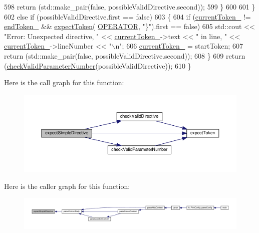 \begin{DoxyCode}
598                 \textcolor{keywordflow}{return} (std::make\_pair(\textcolor{keyword}{false}, possibleValidDirective.second));
599             \}
600         
601         \}
602         \textcolor{keywordflow}{else} \textcolor{keywordflow}{if} (possibleValidDirective.first == \textcolor{keyword}{false})
603         \{
604             \textcolor{keywordflow}{if} (\hyperlink{classft_1_1_parser_a942c5b794d108f144c5b5028aaa34cb6}{currentToken\_} != \hyperlink{classft_1_1_parser_a538ba3ab8ee1d0cef5cc3c999f3ab44c}{endToken\_} && \hyperlink{classft_1_1_parser_a1615a752d3642bb53598e2c8db810db0}{expectToken}(
      \hyperlink{namespaceft_aa520fbf142ba1e7e659590c07da31921a6411d9d6073252e4d316493506bbb979}{OPERATOR}, \textcolor{stringliteral}{"\}"}).first == \textcolor{keyword}{false})
605                 std::cout << \textcolor{stringliteral}{"Error: Unexpected directive, "} << \hyperlink{classft_1_1_parser_a942c5b794d108f144c5b5028aaa34cb6}{currentToken\_}->text << \textcolor{stringliteral}{" in
       line, "} << \hyperlink{classft_1_1_parser_a942c5b794d108f144c5b5028aaa34cb6}{currentToken\_}->lineNumber << \textcolor{stringliteral}{"\(\backslash\)n"};
606             \hyperlink{classft_1_1_parser_a942c5b794d108f144c5b5028aaa34cb6}{currentToken\_} = startToken;
607             return (std::make\_pair(\textcolor{keyword}{false}, possibleValidDirective.second));
608         \}
609         \textcolor{keywordflow}{return} (\hyperlink{classft_1_1_parser_a31501116433b0b1f8d9d58f27658ea98}{checkValidParameterNumber}(possibleValidDirective));
610     \}
\end{DoxyCode}
Here is the call graph for this function\+:
\nopagebreak
\begin{figure}[H]
\begin{center}
\leavevmode
\includegraphics[width=350pt]{classft_1_1_parser_a292bf0ed87b8e81b59cefb72c70152bd_cgraph}
\end{center}
\end{figure}
Here is the caller graph for this function\+:
\nopagebreak
\begin{figure}[H]
\begin{center}
\leavevmode
\includegraphics[width=350pt]{classft_1_1_parser_a292bf0ed87b8e81b59cefb72c70152bd_icgraph}
\end{center}
\end{figure}
\mbox{\label{classft_1_1_parser_a1615a752d3642bb53598e2c8db810db0}} 
